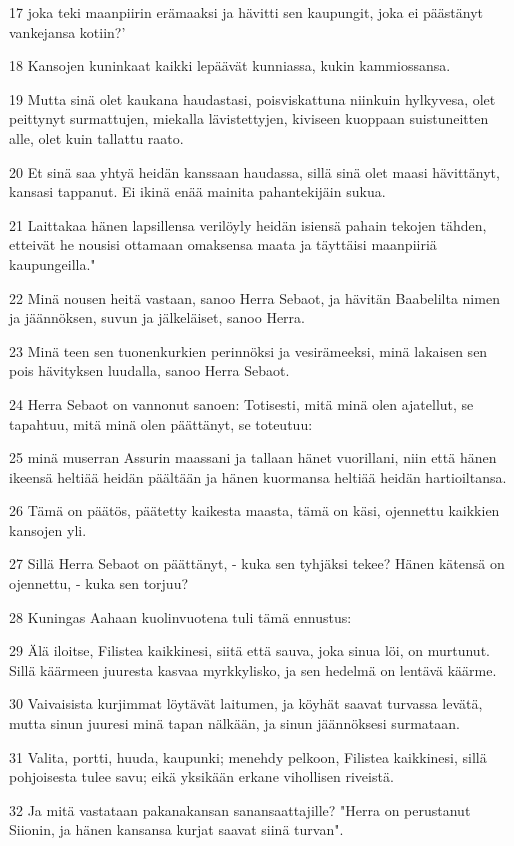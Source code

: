 \par 17 joka teki maanpiirin erämaaksi ja hävitti sen kaupungit, joka ei päästänyt vankejansa kotiin?'
\par 18 Kansojen kuninkaat kaikki lepäävät kunniassa, kukin kammiossansa.
\par 19 Mutta sinä olet kaukana haudastasi, poisviskattuna niinkuin hylkyvesa, olet peittynyt surmattujen, miekalla lävistettyjen, kiviseen kuoppaan suistuneitten alle, olet kuin tallattu raato.
\par 20 Et sinä saa yhtyä heidän kanssaan haudassa, sillä sinä olet maasi hävittänyt, kansasi tappanut. Ei ikinä enää mainita pahantekijäin sukua.
\par 21 Laittakaa hänen lapsillensa verilöyly heidän isiensä pahain tekojen tähden, etteivät he nousisi ottamaan omaksensa maata ja täyttäisi maanpiiriä kaupungeilla."
\par 22 Minä nousen heitä vastaan, sanoo Herra Sebaot, ja hävitän Baabelilta nimen ja jäännöksen, suvun ja jälkeläiset, sanoo Herra.
\par 23 Minä teen sen tuonenkurkien perinnöksi ja vesirämeeksi, minä lakaisen sen pois hävityksen luudalla, sanoo Herra Sebaot.
\par 24 Herra Sebaot on vannonut sanoen: Totisesti, mitä minä olen ajatellut, se tapahtuu, mitä minä olen päättänyt, se toteutuu:
\par 25 minä muserran Assurin maassani ja tallaan hänet vuorillani, niin että hänen ikeensä heltiää heidän päältään ja hänen kuormansa heltiää heidän hartioiltansa.
\par 26 Tämä on päätös, päätetty kaikesta maasta, tämä on käsi, ojennettu kaikkien kansojen yli.
\par 27 Sillä Herra Sebaot on päättänyt, - kuka sen tyhjäksi tekee? Hänen kätensä on ojennettu, - kuka sen torjuu?
\par 28 Kuningas Aahaan kuolinvuotena tuli tämä ennustus:
\par 29 Älä iloitse, Filistea kaikkinesi, siitä että sauva, joka sinua löi, on murtunut. Sillä käärmeen juuresta kasvaa myrkkylisko, ja sen hedelmä on lentävä käärme.
\par 30 Vaivaisista kurjimmat löytävät laitumen, ja köyhät saavat turvassa levätä, mutta sinun juuresi minä tapan nälkään, ja sinun jäännöksesi surmataan.
\par 31 Valita, portti, huuda, kaupunki; menehdy pelkoon, Filistea kaikkinesi, sillä pohjoisesta tulee savu; eikä yksikään erkane vihollisen riveistä.
\par 32 Ja mitä vastataan pakanakansan sanansaattajille? "Herra on perustanut Siionin, ja hänen kansansa kurjat saavat siinä turvan".

